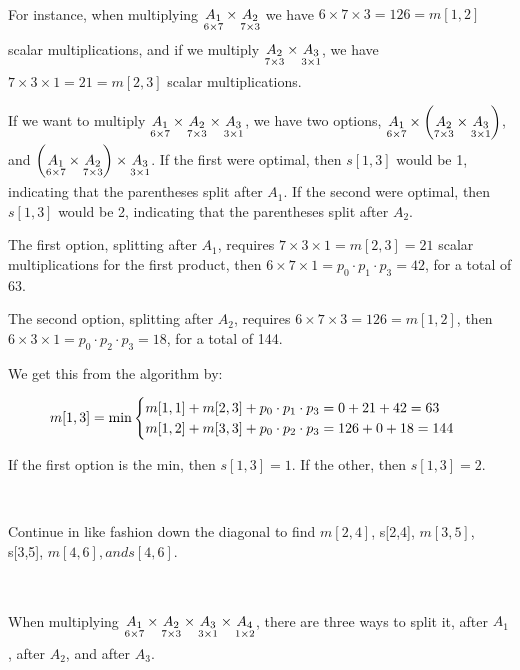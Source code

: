 \

For instance, when multiplying
$\displaystyle\underset{6 \times 7}{A_1} \times \underset{7 \times 3}{A_2}\vrule width 0pt height 12pt depth 12pt$
we have $6 \times 7 \times 3 = 126 = m[1,2]$ scalar multiplications, and if we multiply 
$\displaystyle\underset{7 \times 3}{A_2} \times \underset{3 \times 1}{A_3}\vrule width 0pt height 12pt depth 12pt$, 
we have $7 \times 3 \times 1 = 21 = m[2,3]$ scalar multiplications.  

If we want to multiply
$\displaystyle \underset{6 \times 7}{A_1} \times\underset{7 \times 3}{A_2} \times \underset{3 \times 1}{A_3}\vrule width 0pt height 12pt depth 12pt$, 
we have two options, 
$\displaystyle \underset{6 \times 7}{A_1} \times \left(\underset{7 \times 3}{A_2} \times \underset{3 \times 1}{A_3}\right)\vrule width 0pt height 12pt depth 12pt$,
and
$\displaystyle \left(\underset{6 \times 7}{A_1} \times\underset{7 \times 3}{A_2}\right) \times \underset{3 \times 1}{A_3}\vrule width 0pt height 12pt depth 12pt$. 
If the first were optimal, then $s[1,3]$ would be 1, indicating that the parentheses split after $A_1$.  If the second were optimal, then $s[1,3]$ would be 2, indicating that the parentheses split after $A_2$.  

The first option, splitting after $A_1$, requires $7 \times 3 \times 1 = m[2,3] = 21$ scalar multiplications for the first product, then $6 \times 7 \times 1 = p_0 \cdot p_1 \cdot p_3 = 42$, for a total of  $63$.  

The second option, splitting after $A_2$, requires $6 \times 7 \times 3 = 126 = m[1,2]$, then $6 \times 3 \times 1 = p_0 \cdot p_2 \cdot p_3 = 18$, for a total of 144.  

We get this from the algorithm by:

$$m[1,3] = \min 
\begin{cases}
	m[1,1] + m[2,3] + p_0 \cdot p_1 \cdot p_3 = 0 + 21 + 42 = 63 \cr
	m[1,2] + m[3,3] + p_0 \cdot p_2 \cdot p_3 = 126 + 0 + 18 = 144 \cr
\end{cases}
$$

If the first option is the min, then $s[1,3] = 1$.  If the other, then $s[1,3] = 2$.  

\

Continue in like fashion down the diagonal to find $m[2,4]$, s[2,4], $m[3,5]$, s[3,5], $m[4,6], and s[4,6]$.  

\

When multiplying 
$\displaystyle 
\underset{6 \times 7}{A_1} \times
\underset{7 \times 3}{A_2} \times
\underset{3 \times 1}{A_3} \times
\underset{1 \times 2}{A_4}
\vrule width 0pt height 12pt depth 12pt
$, 
there are three ways to split it, after $A_1$, after $A_2$, and after $A_3$.  

